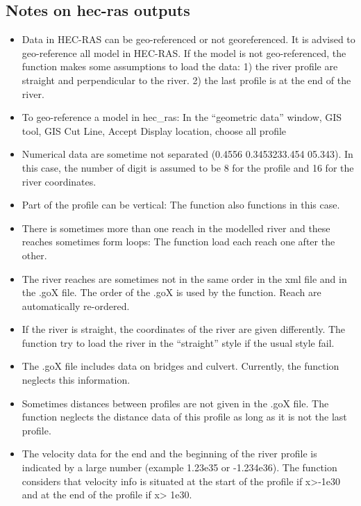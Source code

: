\documentclass[letterpaper,10pt,english]{sphinxmanual}
\begin{document}
\subsection{Notes on hec-ras outputs}
\label{\detokenize{index:notes-on-hec-ras-outputs}}\begin{itemize}
\item {} 
Data in HEC-RAS can be geo-referenced or not georeferenced. It is advised to geo-reference
all model in HEC-RAS. If the model is not geo-referenced, the function makes some assumptions to
load the data: 1) the river profile are straight and perpendicular to the river.
2) the last profile is at the end of the river.

\item {} 
To geo-reference a model in hec\_ras: In the “geometric data” window, GIS tool, GIS Cut Line, Accept Display location, choose all profile

\item {} 
Numerical data are sometime not separated (0.4556 0.3453233.454 05.343). In this case, the number of digit is assumed to be 8 for the profile and 16 for the river coordinates.

\item {} 
Part of the profile can be vertical: The function also functions in this case.

\item {} 
There is sometimes more than one reach in the modelled river and these reaches sometimes form loops: The function load each reach one after the other.

\item {} 
The river reaches are sometimes not in the same order in the xml file and in the .goX file. The order of the .goX is used by the function. Reach are automatically re-ordered.

\item {} 
If the river is straight, the coordinates of the river are given differently. The function try to load the river in the “straight” style if the usual style fail.

\item {} 
The .goX file includes data on bridges and culvert. Currently, the function neglects this information.

\item {} 
Sometimes distances between profiles are not given in the .goX file. The function neglects the distance data of this profile as long as it is not the last profile.

\item {} 
The velocity data for the end and the beginning of the river profile is indicated by a large number (example 1.23e35 or -1.234e36). The function considers that velocity info is situated at the start of the profile if x\textgreater{}-1e30 and at the end of the profile if x\textgreater{} 1e30.


\end{itemize}
\end{document}
